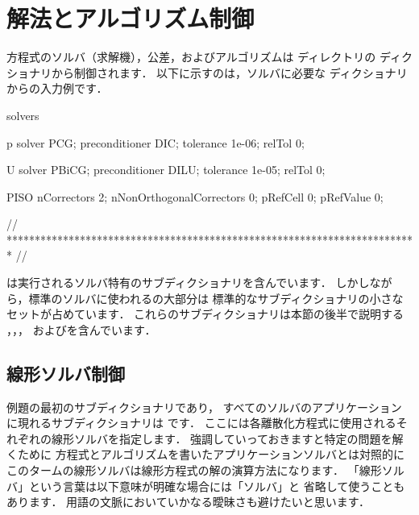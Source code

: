 \section{解法とアルゴリズム制御}
\label{sec:4.5}
方程式のソルバ（求解機），公差，およびアルゴリズムは
ディレクトリの
%
%
ディクショナリから制御されます．
以下に示すのは，ソルバに必要な
ディクショナリからの入力例です．
\begin{OFverbatim}[file, linenum=17]

solvers
{
    p
    {
        solver           PCG;
        preconditioner   DIC;
        tolerance        1e-06;
        relTol           0;
    }

    U
    {
        solver           PBiCG;
        preconditioner   DILU;
        tolerance        1e-05;
        relTol           0;
    }
}

PISO
{
    nCorrectors     2;
    nNonOrthogonalCorrectors 0;
    pRefCell        0;
    pRefValue       0;
}


// ************************************************************************* //
\end{OFverbatim}%
\label{p:U-117}%
は実行されるソルバ特有のサブディクショナリを含んでいます．
しかしながら，標準のソルバに使われるの大部分は
標準的なサブディクショナリの小さなセットが占めています．
これらのサブディクショナリは本節の後半で説明する
，，，
およびを含んでいます．


\subsection{線形ソルバ制御}
\label{ssec:4.5.1}
例題の最初のサブディクショナリであり，
すべてのソルバのアプリケーションに現れるサブディクショナリは
%
%
です．
ここには各離散化方程式に使用されるそれぞれの線形ソルバを指定します．
強調していっておきますと特定の問題を解くために
方程式とアルゴリズムを書いたアプリケーションソルバとは対照的に
このタームの線形ソルバは線形方程式の解の演算方法になります．
「線形ソルバ」という言葉は以下意味が明確な場合には「ソルバ」と
省略して使うこともあります．
用語の文脈においていかなる曖昧さも避けたいと思います．

